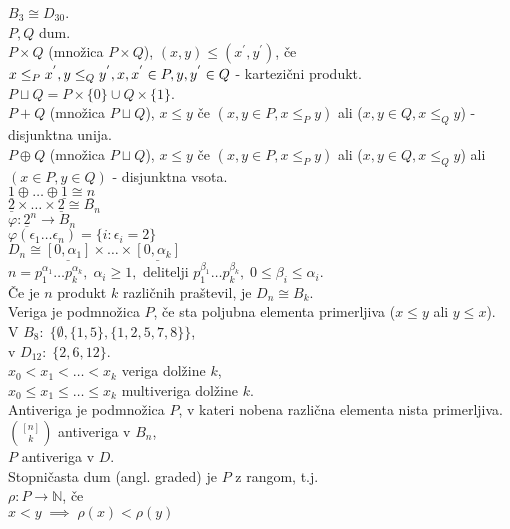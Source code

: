 \documentclass[a4paper, 12pt]{book}
\theoremstyle{definition}
\theoremstyle{remark}
\newcommand{\N}{\mathbb{N}}
\begin{document}
$B_3 \cong D_{30}$. \\
$P, Q$ dum. \\
$P \times Q$ (množica $P \times Q$), $(x,y) \leq (x^{'},y^{'})$, če $x \leq_P x^{'},
y \leq_Q y^{'}, x, x^{'} \in P, \\
y, y^{'} \in Q$ - kartezični produkt. \\
$P \sqcup Q = P \times \{0\} \cup Q \times \{1\}$. \\
$P + Q$ (množica $P \sqcup Q$), $x \leq y$ če $(x,y \in P, x \leq_P y)$ ali ($x,y \in Q, x \leq_Q y$)
- disjunktna unija. \\
$P \oplus Q$ (množica $P \sqcup Q$), $x \leq y$ če $(x,y \in P, x \leq_P y)$ ali ($x,y \in Q, x \leq_Q y$)
ali $(x \in P, y \in Q)$ - disjunktna vsota. \\
$\underline{1} \oplus \dots \oplus \underline{1} \cong \underline{n}$ \\
$\underline{2} \times \dots \times \underline{2} \cong B_n$ \\
$\varphi: \underline{2}^n \to B_n$ \\
$\varphi(\epsilon_1 \dots \epsilon_n) = \{i: \epsilon_i = 2\}$ \\
$D_n \cong \underline{[0, \alpha_1]} \times \dots \times \underline{[0, \alpha_k]}$ \\
$n = p_1^{\alpha_1} \dots p_k^{\alpha_k}, \; \alpha_i \geq 1,$ delitelji
$p_1^{\beta_1} \dots p_k^{\beta_k}, \; 0 \leq \beta_i \leq \alpha_i$. \\
Če je $n$ produkt $k$ različnih praštevil, je $D_n \cong B_k$. \\
Veriga je podmnožica $P$, če sta poljubna elementa primerljiva ($x \leq y$ ali $y \leq x$). \\
V $B_8: \; \{\emptyset, \{1, 5\}, \{1, 2, 5, 7, 8\}\}$, \\
v $D_12: \; \{2, 6, 12\}$. \\
$x_0 < x_1 < \dots < x_k$ veriga dolžine $k$, \\
$x_0 \leq x_1 \leq \dots \leq x_k$ multiveriga dolžine $k$. \\
Antiveriga je podmnožica $P$, v kateri nobena različna elementa nista primerljiva. \\
$\binom{[n]}{k}$ antiveriga v $B_n$, \\
$P$ antiveriga v $D$. \\
Stopničasta dum (angl. graded) je $P$ z rangom, t.j. \\
$\rho: P \to \N$, če \\
$x < y \; \implies \; \rho(x) < \rho(y)$ \\
\end{document}
